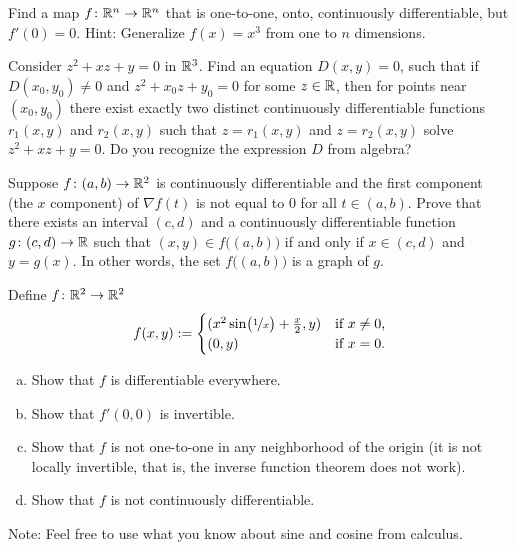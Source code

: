 \begin{exercise}
Find a map $f \colon {\mathbb{R}}^n \to {\mathbb{R}}^n$ that is one-to-one, onto,
continuously differentiable, but $f'(0) = 0$.  Hint: Generalize $f(x) = x^3$ from one
to $n$ dimensions.
\end{exercise}

\begin{exercise}
Consider $z^2 + xz + y =0$ in ${\mathbb{R}}^3$.  Find an equation $D(x,y)=0$, such that
if $D(x_0,y_0) \not= 0$ and $z^2+x_0z+y_0 = 0$ for some $z \in {\mathbb{R}}$,
then for points near $(x_0,y_0)$ there exist
exactly two distinct continuously differentiable functions $r_1(x,y)$
and $r_2(x,y)$ such that $z=r_1(x,y)$ and $z=r_2(x,y)$ solve
$z^2 + xz + y =0$.  Do you recognize the expression $D$ from algebra?
\end{exercise}


\begin{exercise}
Suppose $f \colon (a,b) \to {\mathbb{R}}^2$ is continuously differentiable and
the first component (the $x$ component) of $\nabla f(t)$ is not equal to 0
for all $t \in (a,b)$.
Prove that there exists an interval $(c,d)$ and
a continuously differentiable function $g \colon (c,d) \to {\mathbb{R}}$
such that 
$(x,y) \in f\bigl((a,b)\bigr)$ if and only if $x \in (c,d)$ and $y=g(x)$.
In other words, the set
$f\bigl((a,b)\bigr)$ is a graph of $g$.
\end{exercise}

\begin{samepage}
\begin{exercise}
Define $f \colon {\mathbb{R}}^2 \to {\mathbb{R}}^2$
\begin{equation*}
f(x,y) :=
\begin{cases}
(x^2 \sin \bigl(\nicefrac{1}{x}\bigr) + \frac{x}{2} , y ) & \text{if $x \not= 0$,} \\
(0,y) & \text{if $x=0$.}
\end{cases}
\end{equation*}
\begin{enumerate}[a)]
\item
Show that $f$ is differentiable everywhere.
\item
Show that $f'(0,0)$ is invertible.
\item
Show that $f$ is not one-to-one in any neighborhood of the origin (it is
not locally invertible, that is, the inverse function theorem does not work).
\item
Show that $f$ is not continuously differentiable.
\end{enumerate}
Note: Feel free to use what you know about sine and cosine from calculus.
\end{exercise}
\end{samepage}

